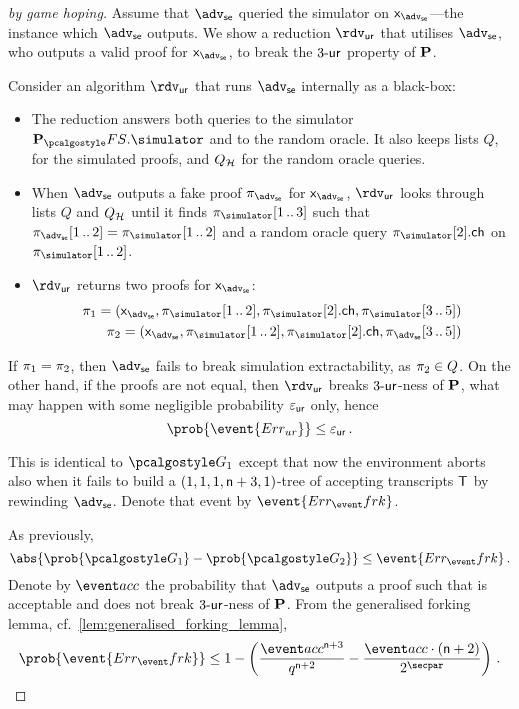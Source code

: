 \documentclass[runningheads,11pt]{llncs}
\theoremstyle{definition}
\begin{document}
\begin{proof}[by game hoping]
	Assume that $\advse$ queried the simulator on $\inp_{\advse}$---the instance which $\advse$ outputs. 
	We show a reduction $\rdvur$ that utilises $\advse$, who outputs a valid proof for $\inp_\advse$, to break the ${3\text{-}\mathsf{ur}}$ property of $\mathbf{P}$. 

	Consider an algorithm $\rdvur$ that runs $\advse$ internally as a black-box:
	\begin{itemize}
		\item The reduction answers both queries to the simulator $\plonkprotfs.\simulator$ and to the random oracle. 
		It also keeps lists $Q$, for the simulated proofs, and $Q_{\mathcal{H}}$ for the random oracle queries. 
		\item When $\advse$ outputs a fake proof $\zkproof_{\advse}$ for  $\inp_\advse$, $\rdvur$ looks through lists $Q$ and $Q_{\mathcal{H}}$ until it finds 
		$\zkproof_{\simulator}\range{1}{3}$ such that $\zkproof_{\advse}\range{1}{2} = \zkproof_{\simulator}\range{1}{2}$ and a random oracle query $\zkproof_{\simulator}[2].\ch$ on $\zkproof_{\simulator}\range{1}{2}$.
		\item $\rdvur$ returns two proofs for $\inp_\advse$:
		\begin{align*}
			\zkproof_1 = (\inp_{\advse},\zkproof_{\simulator}\range{1}{2}, \zkproof_{\simulator}[2].\ch, \zkproof_{\simulator}\range{3}{5})\\
			\zkproof_2 = (\inp_{\advse}, \zkproof_{\simulator}\range{1}{2}, \zkproof_{\simulator}[2].\ch, \zkproof_{\advse}\range{3}{5})
		\end{align*}
		\end{itemize}  
		If $\pi_1 = \pi_2$, then $\advse$ fails to break simulation extractability, as $\pi_2 \in Q$.
		On the other hand, if the proofs are not equal, then $\rdvur$ breaks ${3\text{-}\mathsf{ur}}$-ness of $\mathbf{P}$, what may happen with some negligible probability $\varepsilon_{\mathsf{ur}}$ only, hence
		\[
			\prob{\event{\errur}} \leq \epsur\,.
		\]
		
	This is identical to $\game{1}$ except that now the environment aborts also when it fails to build a $(1, 1, 1, \mathsf{n} + 3, 1)$-tree of accepting transcripts $\mathsf{T}$ by rewinding $\advse$. Denote that event 
	by $\event{\errfrk}$.
	
	As previously, 
	\[
		\abs{\prob{\game{1}} - \prob{\game{2}}} \leq \event{\errfrk}\,.
	\]
	Denote by $\accProb$ the probability that $\advse$ outputs a proof such that is acceptable and does not break ${3\text{-}\mathsf{ur}}$-ness of $\mathbf{P}$. 
	From the generalised forking lemma, cf.~\cref{lem:generalised_forking_lemma}, 
	\[
		\prob{\event{\errfrk}} \leq 1 - \left(\frac{\accProb^{\numberofconstrains + 3}}{q^{\numberofconstrains + 2}} - \frac{\accProb \cdot (\numberofconstrains + 2)}{2^\secpar}\right)\,.
	\]
	

\end{proof}
\end{document}
